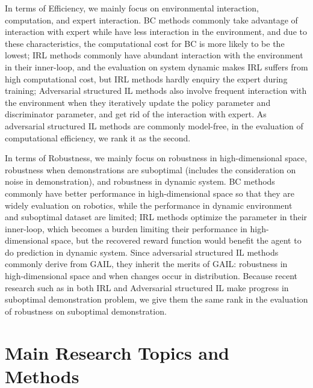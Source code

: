 \documentclass[acmsmall]{acmart}
\begin{document}
In terms of Efficiency, we mainly focus on environmental interaction, computation, and expert interaction. BC methods commonly take advantage of interaction with expert while have less interaction in the environment, and due to these characteristics, the computational cost for BC is more likely to be the lowest; IRL methods commonly have abundant interaction with the environment in their inner-loop, and the evaluation on system dynamic makes IRL suffers from high computational cost, but IRL methods hardly enquiry the expert during training; Adversarial structured IL methods also involve frequent interaction with the environment when they iteratively update the policy parameter and discriminator parameter, and get rid of the interaction with expert. As adversarial structured IL methods are commonly model-free, in the evaluation of computational efficiency, we rank it as the second.

In terms of Robustness, we mainly focus on robustness in high-dimensional space, robustness when demonstrations are suboptimal (includes the consideration on noise in demonstration), and robustness in dynamic system. BC methods commonly have better performance in high-dimensional space so that they are widely evaluation on robotics, while the performance in dynamic environment and suboptimal dataset are limited; IRL methods optimize the parameter in their inner-loop, which becomes a burden limiting their performance in high-dimensional space, but the recovered reward function would benefit the agent to do prediction in dynamic system. Since adversarial structured IL methods commonly derive from GAIL, they inherit the merits of GAIL: robustness in high-dimensional space and when changes occur in distribution. Because recent research such as\cite{dingGoalconditionedImitationLearning2019,brownExtrapolatingSuboptimalDemonstrations2019,Zuo2020offpolicyRAIL} in both IRL and Adversarial structured IL make progress in suboptimal demonstration problem, we give them the same rank in the evaluation of robustness on suboptimal demonstration.

\section{Main Research Topics and Methods}\label{main topic}
\end{document}
